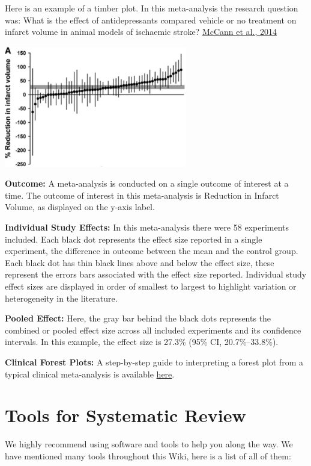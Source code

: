 \documentclass[
]{book}
\begin{document}
Here is an example of a timber plot. In this meta-analysis the research question was: What is the effect of antidepressants compared vehicle or no treatment on infarct volume in animal models of ischaemic stroke? \href{https://doi.org/10.1161/STROKEAHA.114.006304}{McCann et al., 2014}

\includegraphics[width=0.6\textwidth,height=\textheight]{figs/timberplot.png}

\textbf{Outcome:}
A meta-analysis is conducted on a single outcome of interest at a time. The outcome of interest in this meta-analysis is Reduction in Infarct Volume, as displayed on the y-axis label.

\textbf{Individual Study Effects:}
In this meta-analysis there were 58 experiments included. Each black dot represents the effect size reported in a single experiment, the difference in outcome between the mean and the control group. Each black dot has thin black lines above and below the effect size, these represent the errors bars associated with the effect size reported. Individual study effect sizes are displayed in order of smallest to largest to highlight variation or heterogeneity in the literature.

\textbf{Pooled Effect:}
Here, the gray bar behind the black dots represents the combined or pooled effect size across all included experiments and its confidence intervals. In this example, the effect size is 27.3\% (95\% CI, 20.7\%--33.8\%).

\textbf{Clinical Forest Plots:} A step-by-step guide to interpreting a forest plot from a typical clinical meta-analysis is available \href{https://s4be.cochrane.org/blog/2016/07/11/tutorial-read-forest-plot/}{here}.

\chapter{Tools for Systematic Review}\label{tools-for-systematic-review}

We highly recommend using software and tools to help you along the way. We have mentioned many tools throughout this Wiki, here is a list of all of them:
\end{document}
